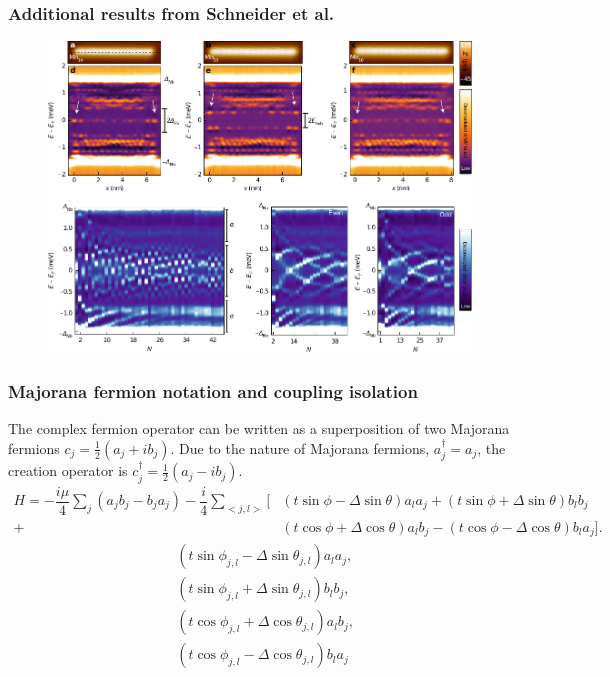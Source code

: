 \documentclass[xcolor=dvipsnames,10pt,aspectratio=169]{beamer}
\newcommand{\cc}{c^{\dagger}}
\newcommand{\de}{\Delta}
\begin{document}
  \begin{frame}
    \frametitle{Additional results from Schneider et al.}

    \begin{figure}
      \includegraphics[height=0.8\textheight]{./figures/Schneider-additional-results.pdf}
    \end{figure}

  \end{frame}

  \begin{frame}
  \frametitle{Majorana fermion notation and coupling isolation}
    The complex fermion operator can be written as a superposition of two Majorana fermions $c_j = \frac{1}{2} (a_j + i b_j)$.
    Due to the nature of Majorana fermions, $a^{\dagger}_j = a_j$, the creation operator is $\cc_j = \frac{1}{2} (a_j - i b_j)$.
    \begin{align*}
      H = -\dfrac{i\mu}{4} \sum_j (a_j b_j - b_j a_j) - \dfrac{i}{4} \sum_{<j,l>} [&(t\sin\phi-\de\sin\theta) a_l a_j + (t\sin\phi+\de\sin\theta) b_l b_j \nonumber \\
      +&(t\cos\phi+\de\cos\theta) a_l b_j - (t\cos\phi-\de\cos\theta) b_l a_j].
    \end{align*}
    \begin{align}
      &(t \sin\phi_{j,l} - \de \sin\theta_{j,l}) a_l a_j, \\
      &(t \sin\phi_{j,l} + \de \sin\theta_{j,l}) b_l b_j, \\
      &(t \cos\phi_{j,l} + \de \cos\theta_{j,l}) a_l b_j, \\
      &(t \cos\phi_{j,l} - \de \cos\theta_{j,l}) b_l a_j
    \end{align}
  \end{frame}
\end{document}
